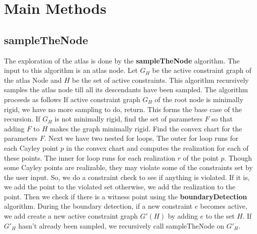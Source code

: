 \section{Main Methods}

\subsection{sampleTheNode}
The exploration of the atlas is done by the \textbf{sampleTheNode} algorithm.
The input to this algorithm is an atlas node. Let $G_H$ be the active constraint
graph of the atlas Node and $H$ be the set of active constraints.
This algorithm recursively samples the atlas node till all its  descendants
have been sampled. The algorithm proceeds as follows
If active constraint graph $G_H$ of the root node is minimally rigid, we have
no more sampling to do, return. This forms the base case of the recursion.
If $G_H$ is not minimally rigid, find the set of parameters $F$ so that 
adding $F$ to $H$ makes the graph minimally rigid. Find the convex chart for
the parameters $F$. 
Next we have two nested for loops. The outer for loop runs for each Cayley 
point $p$ in the convex chart and computes the realization for each of these
points. The inner for loop runs for each realization $r$ of the point $p$. 
Though some Cayley points are realizable, they may violate some of the
constraints set by the user input. So, we do a constraint check to see
if anything is violated. If it is, we add the point to the violated set
otherwise, we add the realization to the point.	Then we check
if there is a witness point using the \textbf{boundaryDetection} algorithm.
During the boundary detection, if a new constraint $e$ becomes active,
we add create a new active constraint graph $G'(H)$ by adding $e$ to the
set $H$. If $G'_H$ hasn't already been sampled, we recursively call
sampleTheNode on $G'_H$.

